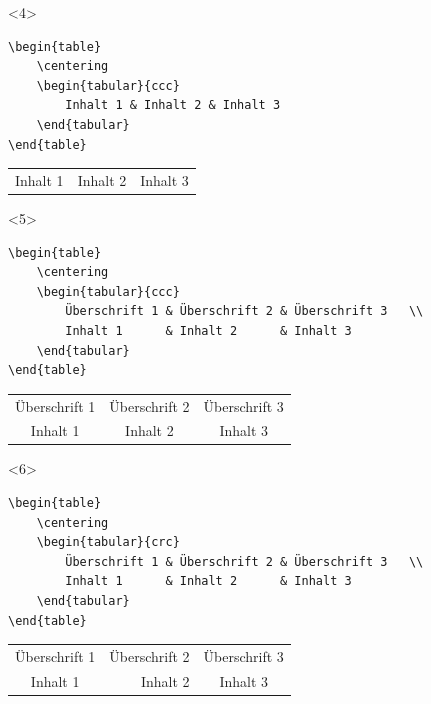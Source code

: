 \documentclass["WS\space 16-17\space -\space LaTeX-Kurs\space -\space Praesentation\space -\space 2.tex"]{subfiles}
\begin{document}
\begin{frame}[fragile]
	\begin{onlyenv}
		\Code
		\begin{lstlisting}
\begin{table}
	\centering
	\begin{tabular}{ccc}
		Inhalt 1 & Inhalt 2 & Inhalt 3
	\end{tabular}
\end{table}
		\end{lstlisting}
		\Ausgabe
		\begin{outputbox}
			\begin{table}
				\centering
				\begin{tabular}{ccc}
					Inhalt 1 & Inhalt 2 & Inhalt 3
				\end{tabular}
			\end{table}
		\end{outputbox}
	\end{onlyenv}

	\begin{onlyenv}
		\Code
		\begin{lstlisting}
\begin{table}
	\centering
	\begin{tabular}{ccc}
		Überschrift 1 & Überschrift 2 & Überschrift 3	\\
		Inhalt 1      & Inhalt 2      & Inhalt 3
	\end{tabular}
\end{table}
		\end{lstlisting}
		\Ausgabe
		\begin{outputbox}
			\begin{table}
				\centering
				\begin{tabular}{ccc}
					Überschrift 1 & Überschrift 2 & Überschrift 3	\\
					Inhalt 1 & Inhalt 2 & Inhalt 3
				\end{tabular}
			\end{table}
		\end{outputbox}
	\end{onlyenv}

	\begin{onlyenv}
		\Code
		\begin{lstlisting}
\begin{table}
	\centering
	\begin{tabular}{crc}
		Überschrift 1 & Überschrift 2 & Überschrift 3	\\
		Inhalt 1      & Inhalt 2      & Inhalt 3
	\end{tabular}
\end{table}
		\end{lstlisting}
		\Ausgabe
		\begin{outputbox}
			\begin{table}
				\centering
				\begin{tabular}{crc}
					Überschrift 1 & Überschrift 2 & Überschrift 3	\\
					Inhalt 1 & Inhalt 2 & Inhalt 3
				\end{tabular}
			\end{table}
		\end{outputbox}
	\end{onlyenv}


\end{frame}
\end{document}
